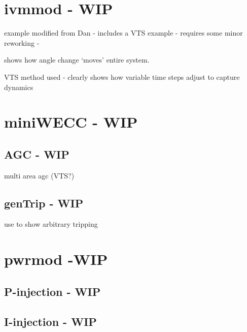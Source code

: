 





\pagebreak
\section{ivmmod - WIP} \label{sec: ivmmod ex}
example modified from Dan - includes a VTS example  -
requires some minor reworking - 

shows how angle change `moves' entire system.

VTS method used - clearly shows how variable time steps adjust to capture dynamics


\pagebreak
\section{miniWECC - WIP}

\subsection{AGC - WIP} 
multi area agc (VTS?)

\subsection{genTrip - WIP} 
use to show arbitrary tripping


\pagebreak
\section{pwrmod -WIP} \label{sec: pwrmodExamples}
\subsection{P-injection - WIP}
\subsection{I-injection - WIP}

\pagebreak


